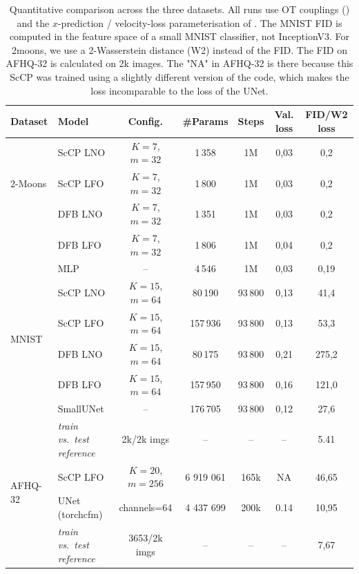 \documentclass[a4paper,11pt]{article}
\theoremstyle{plain}{\theorembodyfont{\rmfamily}%
\newtheorem{proposition}[theorem]{Proposition}}
\theoremstyle{plain}{\theorembodyfont{\rmfamily}%
\newtheorem{notation}[theorem]{Notation}}
\theoremstyle{plain}{\theorembodyfont{\rmfamily}%
\newtheorem{assumption}[theorem]{Assumption}}
\theoremstyle{plain}{\theorembodyfont{\rmfamily}%
\newtheorem{problem}[theorem]{Problem}}
\theoremstyle{plain}{\theorembodyfont{\rmfamily}%
\newtheorem{example}[theorem]{Example}}
\theoremstyle{plain}{\theorembodyfont{\rmfamily}%
\newtheorem{remark}[theorem]{Remark}}
\theoremstyle{plain}{\theorembodyfont{\rmfamily}%
\newtheorem{definition}[theorem]{Definition}}
\theoremstyle{plain}{\theorembodyfont{\rmfamily}%
\newtheorem{question}[theorem]{Question}}
\numberwithin{equation}{section}
\begin{document}
\begin{table}[h]
\centering
\small
\begin{tabular}{llccccc}
\toprule
Dataset & Model & Config. & \#Params & Steps & Val. loss & FID/W2 loss \\
\midrule
\multirow{3}{*}{2-Moons}
 & ScCP LNO & $K{=}7$, $m{=}32$ & 1\,358   & 1M & 0,03 & 0,2 \\
 & ScCP LFO & $K{=}7$, $m{=}32$ & 1\,800   & 1M & 0,03 & 0,2 \\
 & DFB LNO & $K{=}7$, $m{=}32$ & 1\,351   & 1M & 0,03 & 0,2 \\
 & DFB LFO & $K{=}7$, $m{=}32$ & 1\,806   & 1M & 0,04 & 0,2 \\
 & MLP      & --                 & 4\,546   & 1M & 0,03 & 0,19 \\
\midrule
\multirow{4}{*}{MNIST}
 & ScCP LNO  & $K{=}15$, $m{=}64$ & 80\,190 & 93\,800 & 0,13 & 41,4 \\
 & ScCP LFO  & $K{=}15$, $m{=}64$ & 157\,936 & 93\,800 & 0,13    & 53,3 \\
 & DFB LNO & $K{=}15$, $m{=}64$ & 80\,175 & 93\,800 & 0,21 & 275,2 \\
 & DFB LFO & $K{=}15$, $m{=}64$ & 157\,950 & 93\,800 & 0,16 & 121,0 \\
 & SmallUNet & --                 & 176\,705  & 93\,800 & 0,12 & 27,6 \\
 & \textit{train vs.\ test reference} & 2k/2k imgs & -- & -- & -- & 5.41 \\
\midrule
\multirow{2}{*}{AFHQ-32}
 & ScCP LFO        & $K{=}20$, $m{=}256$ & 6 919 061 & 165k & NA & 46,65 \\
 & UNet (torchcfm) & channels=64      & 4 437 699 & 200k & 0.14 & 10,95 \\
 & \textit{train vs.\ test reference} &  3653/2k imgs & -- & -- & -- & 7,67 \\
\bottomrule
\end{tabular}
\caption{Quantitative comparison across the three datasets. All runs use OT
couplings () and the $x$-prediction / velocity-loss
parameterisation of . The MNIST FID is computed in the
feature space of a small MNIST classifier, not InceptionV3. For 2moons, we use a 2-Wasserstein distance (W2) instead of the FID. The FID on AFHQ-32 is calculated on 2k images. The "NA" in AFHQ-32 is there because this ScCP was trained using a slightly different version of the code, which makes the loss incomparable to the loss of the UNet.}
\label{tab:quantitative}
\end{table}
\end{document}
